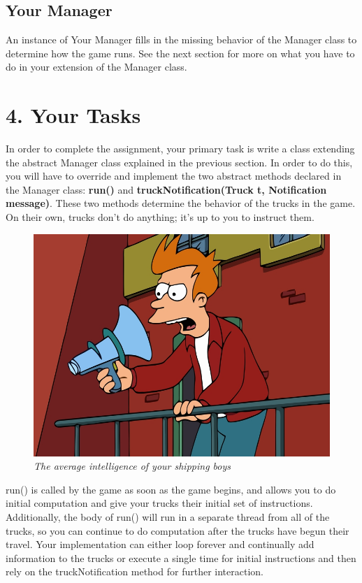 \documentclass[11pt]{article}
\begin{document}
\subsection{Your Manager}
An instance of Your Manager fills in the missing behavior of the Manager class to determine how the game runs. See the next section for more on what you have to do in your extension of the Manager class.

\newpage
\section{4. Your Tasks}
In order to complete the assignment, your primary task is write a class extending the abstract Manager class explained in the previous section. In order to do this, you will have to override and implement the two abstract methods declared in the Manager class: \textbf{run()} and \textbf{truckNotification(Truck t, Notification message)}. These two methods determine the behavior of the trucks in the game. On their own, trucks don't do anything; it's up to you to instruct them.\\

\begin{figure}[h]
\centerline{\includegraphics[scale=0.4]{fry.jpg}} 
\caption{\em{The average intelligence of your shipping boys}}
\end{figure}

run() is called by the game as soon as the game begins, and allows you to do initial computation and give your trucks their initial set of instructions. Additionally, the body of run() will run in a separate thread from all of the trucks, so you can continue to do computation after the trucks have begun their travel. Your implementation can either loop forever and continually add information to the trucks or execute a single time for initial instructions and then rely on the truckNotification method for further interaction.\\
\end{document}
